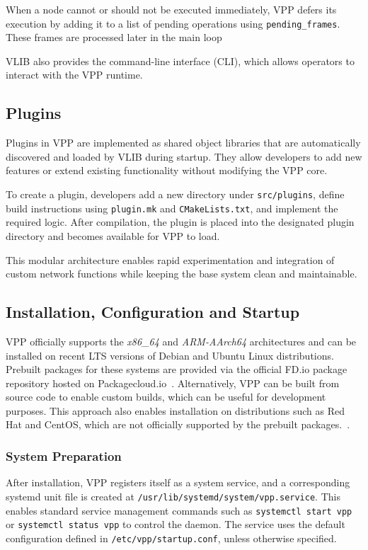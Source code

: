 When a node cannot or should not be executed immediately, 
VPP defers its execution by adding it to a list of pending operations using \texttt{pending\_frames}.
These frames are processed later in the main loop

VLIB also provides the command-line interface (CLI), which allows operators to interact with the VPP runtime.\cite{fdio-vpp-vlib-2506}

\subsection{Plugins}
Plugins in VPP are implemented as shared object libraries that are automatically discovered and loaded by VLIB during startup. 
They allow developers to add new features or extend existing functionality without modifying the VPP core.

To create a plugin, developers add a new directory under \texttt{src/plugins}, define build instructions using \texttt{plugin.mk} and \texttt{CMakeLists.txt}, and implement the required logic. 
After compilation, the plugin is placed into the designated plugin directory and becomes available for VPP to load.

This modular architecture enables rapid experimentation and integration of custom network functions while keeping the base system clean and maintainable.~\cite{fdio-vpp-plugins-2506, fdio-vpp-addplugin-2506}

\subsection{Installation, Configuration and Startup}
VPP officially supports the \textit{x86\_64} and \textit{ARM-AArch64} architectures and can be installed on recent LTS versions of Debian and Ubuntu Linux distributions.~\cite{fdio-supported-2025}
Prebuilt packages for these systems are provided via the official FD.io package repository hosted on Packagecloud.io~\cite{fdio-packagecloud}.
Alternatively, VPP can be built from source code to enable custom builds, which can be useful for development purposes.
This approach also enables installation on distributions such as Red Hat and CentOS, which are not officially supported by the prebuilt packages.~\cite{fdio-building-guide}.

\subsubsection{System Preparation}
After installation, VPP registers itself as a system service, and a corresponding systemd unit file is created at \texttt{/usr/lib/systemd/system/vpp.service}. 
This enables standard service management commands such as \texttt{systemctl start vpp} or \texttt{systemctl status vpp} to control the daemon. 
The service uses the default configuration defined in \texttt{/etc/vpp/startup.conf}, unless otherwise specified.

